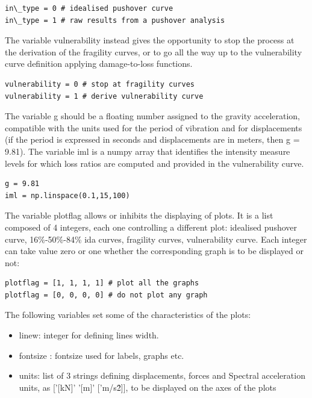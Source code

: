 \begin{Verbatim}[frame=single, commandchars=\\\{\}, samepage=true]
in\_type = 0 # idealised pushover curve
in\_type = 1 # raw results from a pushover analysis
\end{Verbatim}

The variable vulnerability instead gives the opportunity to stop the process at the derivation of the fragility curves, or to go all the way up to the vulnerability curve definition applying damage-to-loss functions.

\begin{Verbatim}[frame=single, commandchars=\\\{\}, samepage=true]
vulnerability = 0 # stop at fragility curves 
vulnerability = 1 # derive vulnerability curve
\end{Verbatim}

The variable g should be a floating number assigned to the gravity acceleration, compatible with the units used for the period of vibration and for displacements (if the period is expressed in seconds and displacements are in meters, then g = 9.81). The variable iml is a numpy array that identifies the intensity measure levels for which loss ratios are computed and provided in the vulnerability curve.

\begin{Verbatim}[frame=single, commandchars=\\\{\}, samepage=true]
g = 9.81
iml = np.linspace(0.1,15,100)
\end{Verbatim}

The variable plotflag allows or inhibits the displaying of plots. It is a list composed of 4 integers, each one controlling a different plot: idealised pushover curve, 16\%-50\%-84\% ida curves, fragility curves, vulnerability curve. Each integer can take value zero or one whether the corresponding graph is to be displayed or not:

\begin{Verbatim}[frame=single, commandchars=\\\{\}, samepage=true]
plotflag = [1, 1, 1, 1] # plot all the graphs
plotflag = [0, 0, 0, 0] # do not plot any graph
\end{Verbatim}

The following variables set some of the characteristics of the plots:

\begin{itemize}
\item linew: integer for defining lines width.
\item fontsize : fontsize used for labels, graphs etc.
\item units: list of 3 strings defining displacements, forces and Spectral acceleration units, as ['[kN]' '[m]' ['m/s\^2]], to be displayed on the axes of the plots
\end{itemize}

